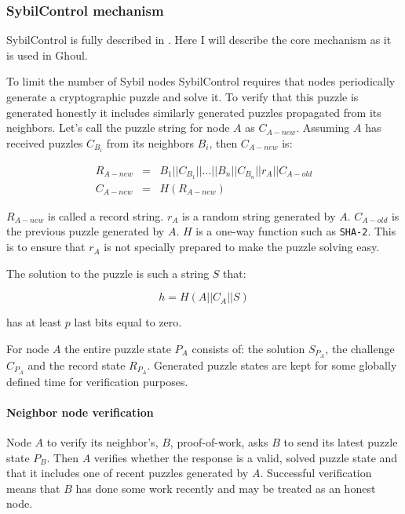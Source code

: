 \subsubsection{SybilControl mechanism}
  SybilControl is fully described in \cite{li12}. Here I will describe the core
  mechanism as it is used in Ghoul. 

  To limit the number of Sybil nodes SybilControl requires that nodes
  periodically generate a cryptographic puzzle and solve it. To verify that
  this puzzle is generated honestly it includes similarly generated puzzles
  propagated from its neighbors. Let's call the puzzle string for node $A$ as
  $C_{A-new}$. Assuming $A$ has received puzzles $C_{B_i}$ from its neighbors
  $B_{i}$, then $C_{A-new}$ is:

  \begin{eqnarray*}
      R_{A-new} &=& B_1||C_{B_1}||\ldots||B_n||C_{B_n}||r_A||C_{A-old}\\
    C_{A-new} &=& H\left(R_{A-new}\right)
  \end{eqnarray*}

  $R_{A-new}$ is called a record string.
  $r_A$ is a random string generated by $A$.
  $C_{A-old}$ is the previous puzzle generated by $A$.
  $H$ is a one-way function such as \texttt{SHA-2}.
  This is to ensure that $r_A$ is not specially prepared to make the puzzle
  solving easy.

  The solution to the puzzle is such a string $S$ that:

  \[ h = H\left(A||C_A||S\right)\]

  has at least $p$ last bits equal to zero.

  For node $A$ the entire puzzle state $P_A$ consists of: the solution
  $S_{P_A}$, the challenge $C_{P_A}$ and the record state $R_{P_A}$.
  Generated puzzle states are kept for some globally defined time for
  verification purposes.

  \paragraph{Neighbor node verification}

  Node $A$ to verify its neighbor's, $B$, proof-of-work, asks $B$
  to send its latest puzzle state $P_B$.
  Then $A$ verifies whether the response is a valid, solved puzzle state and
  that it includes one of recent puzzles generated by $A$.
  Successful verification means that $B$ has done some work recently and may be
  treated as an honest node.

